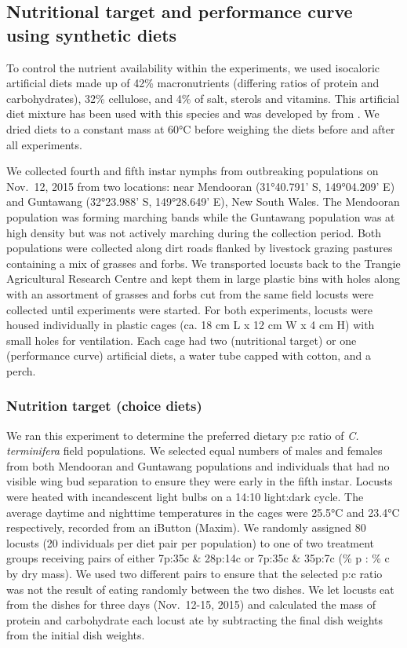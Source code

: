 \documentclass[
]{article}
\begin{document}
\subsection{Nutritional target and performance curve using synthetic
diets}\label{nutritional-target-and-performance-curve-using-synthetic-diets}

To control the nutrient availability within the experiments, we used
isocaloric artificial diets made up of 42\% macronutrients (differing
ratios of protein and carbohydrates), 32\% cellulose, and 4\% of salt,
sterols and vitamins. This artificial diet mixture has been used with
this species \citep{clissold_regulation_2014} and was developed by
\citet{simpson_compensation_1985} from \citet{dadd_nutritional_1961}. We
dried diets to a constant mass at 60°C before weighing the diets before
and after all experiments.

We collected fourth and fifth instar nymphs from outbreaking populations
on Nov.~12, 2015 from two locations: near Mendooran (31°40.791' S,
149°04.209' E) and Guntawang (32°23.988' S, 149°28.649' E), New South
Wales. The Mendooran population was forming marching bands while the
Guntawang population was at high density but was not actively marching
during the collection period. Both populations were collected along dirt
roads flanked by livestock grazing pastures containing a mix of grasses
and forbs. We transported locusts back to the Trangie Agricultural
Research Centre and kept them in large plastic bins with holes along
with an assortment of grasses and forbs cut from the same field locusts
were collected until experiments were started. For both experiments,
locusts were housed individually in plastic cages (ca. 18 cm L x 12 cm W
x 4 cm H) with small holes for ventilation. Each cage had two
(nutritional target) or one (performance curve) artificial diets, a
water tube capped with cotton, and a perch.

\subsubsection{Nutrition target (choice
diets)}\label{nutrition-target-choice-diets}

We ran this experiment to determine the preferred dietary p:c ratio of
\emph{C. terminifera} field populations. We selected equal numbers of
males and females from both Mendooran and Guntawang populations and
individuals that had no visible wing bud separation to ensure they were
early in the fifth instar. Locusts were heated with incandescent light
bulbs on a 14:10 light:dark cycle. The average daytime and nighttime
temperatures in the cages were 25.5°C and 23.4°C respectively, recorded
from an iButton (Maxim). We randomly assigned 80 locusts (20 individuals
per diet pair per population) to one of two treatment groups receiving
pairs of either 7p:35c \& 28p:14c or 7p:35c \& 35p:7c (\% p : \% c by
dry mass). We used two different pairs to ensure that the selected p:c
ratio was not the result of eating randomly between the two dishes. We
let locusts eat from the dishes for three days (Nov.~12-15, 2015) and
calculated the mass of protein and carbohydrate each locust ate by
subtracting the final dish weights from the initial dish weights.
\end{document}
